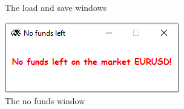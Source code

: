\documentclass[12pt,a4paper]{report}
\begin{document}
\begin{figure}[!ht]
	\centering
	\qquad
	\qquad
	\caption{The load and save windows}
	\label{fig:saveload}
\end{figure}

\begin{figure}[!ht]
	\centering
	\includegraphics[scale=0.7]{pics/nofunds.png}
	\caption{The no funds window}
	\label{fig:nofunds}
\end{figure}


\newpage
\end{document}
